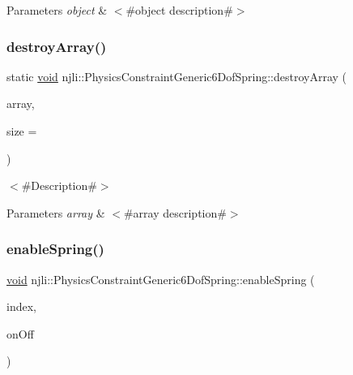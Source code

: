 \begin{DoxyParams}{Parameters}
{\em object} & $<$\#object description\#$>$ \\
\hline
\end{DoxyParams}
\mbox{\label{classnjli_1_1_physics_constraint_generic6_dof_spring_a29dd9a920f0c518800bd91270b761394}} 
\subsubsection{\texorpdfstring{destroy\+Array()}{destroyArray()}}
{\footnotesize\ttfamily static \mbox{\hyperlink{_thread_8h_af1e856da2e658414cb2456cb6f7ebc66}{void}} njli\+::\+Physics\+Constraint\+Generic6\+Dof\+Spring\+::destroy\+Array (\begin{DoxyParamCaption}\item[{\mbox{\hyperlink{classnjli_1_1_physics_constraint_generic6_dof_spring}{Physics\+Constraint\+Generic6\+Dof\+Spring}} $\ast$$\ast$}]{array,  }\item[{const \mbox{\hyperlink{_util_8h_a10e94b422ef0c20dcdec20d31a1f5049}{u32}}}]{size = {} }\end{DoxyParamCaption})\hspace{0.3cm}{\ttfamily [static]}}

$<$\#\+Description\#$>$


\begin{DoxyParams}{Parameters}
{\em array} & $<$\#array description\#$>$ \\
\hline
\end{DoxyParams}
\mbox{\label{classnjli_1_1_physics_constraint_generic6_dof_spring_ac9ee86dda7ea98b3e06130e5cc07a1d9}} 
\subsubsection{\texorpdfstring{enable\+Spring()}{enableSpring()}}
{\footnotesize\ttfamily \mbox{\hyperlink{_thread_8h_af1e856da2e658414cb2456cb6f7ebc66}{void}} njli\+::\+Physics\+Constraint\+Generic6\+Dof\+Spring\+::enable\+Spring (\begin{DoxyParamCaption}\item[{int}]{index,  }\item[{bool}]{on\+Off }\end{DoxyParamCaption})}

